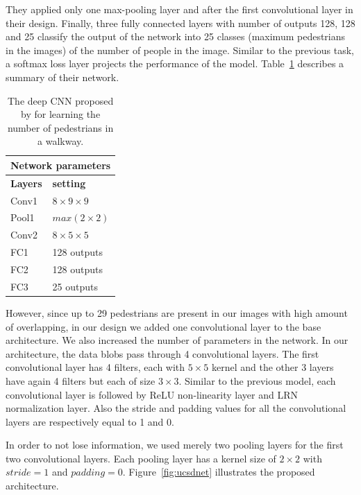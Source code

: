 They applied only one max-pooling layer and after the first convolutional layer in their design. Finally, three fully connected layers with number of outputs 128, 128 and 25 classify the output of the network into 25 classes (maximum pedestrians in the images) of the number of people in the image. Similar to the previous task, a softmax loss layer projects the performance of the model.   
Table~\ref{santiarch} describes a summary of their network.

\begin{table}[H]
	\centering
	\begin{tabular}{ |p{2cm}|p{2cm}| }
	\hline 
	\multicolumn{2}{|c|}{\textbf{Network parameters}} \\
	\hline
	\hline
	\textbf{Layers} & \textbf{setting }\\
	\hline
	Conv1 & $8\times9\times9$\\
	\hline
	Pool1    & $max(2\times2)$ \\
	\hline
	Conv2 & $8\times5\times5$\\
	\hline
	FC1 & 128 outputs \\
	\hline
	FC2 & 128 outputs \\
	\hline
	FC3 & 25 outputs \\
	\hline
	\end{tabular}
		\caption{The deep CNN proposed by \citealt{segui2015learning} for learning the number of pedestrians in a walkway.}
		\label{santiarch}
\end{table}


\noindent However, since up to 29 pedestrians are present in our images with high amount of overlapping, in our design we added one convolutional layer to the base architecture. We also increased the number of parameters in the network. In our architecture, the data blobs pass through 4 convolutional layers. The first convolutional layer has 4 filters, each with $5\times5$ kernel and the other 3 layers have again 4 filters but each of size $3\times3$. Similar to the previous model, each convolutional layer is followed by ReLU non-linearity layer and LRN normalization layer. Also the stride and padding values for all the convolutional layers are respectively equal to 1 and 0. 

\indent In order to not lose information, we used merely two pooling layers for the first two convolutional layers. Each pooling layer has a kernel size of $2\times2$ with $stride = 1$  and $padding = 0$. Figure~\ref{fig:ucsdnet} illustrates the proposed architecture. 


